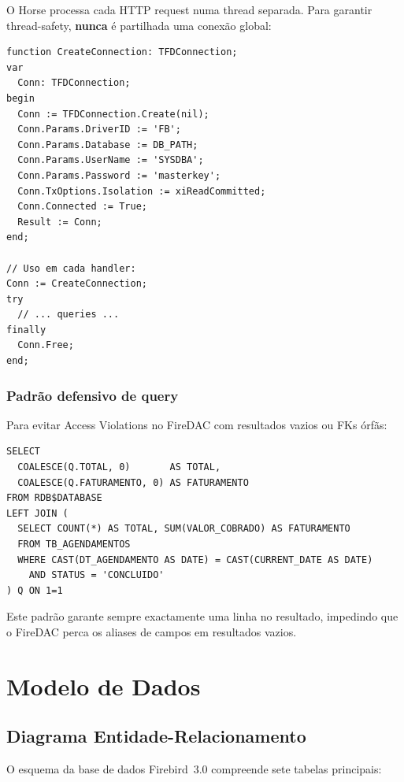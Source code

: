 \documentclass[12pt,a4paper]{article}
\begin{document}
O Horse processa cada HTTP request numa thread separada. Para garantir thread-safety, \textbf{nunca} é partilhada uma conexão global:

\begin{lstlisting}[caption={Padrão per-request em API.Conexao.pas}]
function CreateConnection: TFDConnection;
var
  Conn: TFDConnection;
begin
  Conn := TFDConnection.Create(nil);
  Conn.Params.DriverID := 'FB';
  Conn.Params.Database := DB_PATH;
  Conn.Params.UserName := 'SYSDBA';
  Conn.Params.Password := 'masterkey';
  Conn.TxOptions.Isolation := xiReadCommitted;
  Conn.Connected := True;
  Result := Conn;
end;

// Uso em cada handler:
Conn := CreateConnection;
try
  // ... queries ...
finally
  Conn.Free;
end;
\end{lstlisting}

\subsubsection{Padrão defensivo de query}

Para evitar Access Violations no FireDAC com resultados vazios ou FKs órfãs:

\begin{lstlisting}[caption={Padrão RDB\$DATABASE LEFT JOIN para agregados}]
SELECT
  COALESCE(Q.TOTAL, 0)       AS TOTAL,
  COALESCE(Q.FATURAMENTO, 0) AS FATURAMENTO
FROM RDB$DATABASE
LEFT JOIN (
  SELECT COUNT(*) AS TOTAL, SUM(VALOR_COBRADO) AS FATURAMENTO
  FROM TB_AGENDAMENTOS
  WHERE CAST(DT_AGENDAMENTO AS DATE) = CAST(CURRENT_DATE AS DATE)
    AND STATUS = 'CONCLUIDO'
) Q ON 1=1
\end{lstlisting}

Este padrão garante sempre exactamente uma linha no resultado, impedindo que o FireDAC perca os aliases de campos em resultados vazios.

\newpage
\section{Modelo de Dados}

\subsection{Diagrama Entidade-Relacionamento}

O esquema da base de dados Firebird~3.0 compreende sete tabelas principais:
\end{document}
